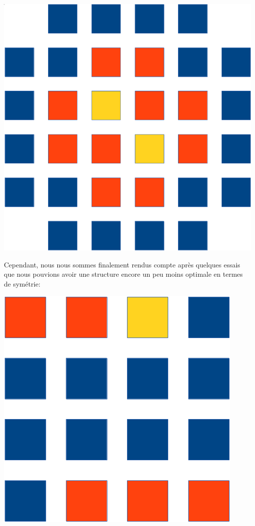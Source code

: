 \documentclass{article}
\begin{document}
\begin{multicols}{2}
    \includegraphics[width=\linewidth-1cm]{placement_mirroirs_ideal.png}

    Cependant, nous nous sommes finalement rendus compte après quelques essais que nous pouvions avoir une structure encore un peu moins optimale en termes de symétrie:

    \includegraphics[width=\linewidth-1cm]{placement_mirroirs_final.png}


\end{multicols}
\end{document}
